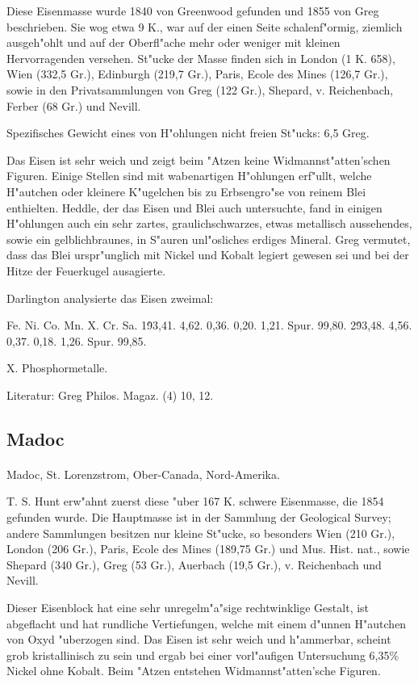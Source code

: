 \documentclass[a4paper, 11pt, oneside]{article}
\begin{document}
Diese Eisenmasse wurde 1840 von Greenwood gefunden und 1855 von Greg beschrieben. Sie wog etwa 9 K., war auf der einen Seite schalenf"ormig, ziemlich ausgeh"ohlt und auf der Oberfl"ache mehr oder weniger mit kleinen Hervorragenden versehen. St"ucke der Masse finden sich in London (1 K. 658), Wien (332,5 Gr.), Edinburgh (219,7 Gr.), Paris, Ecole des Mines (126,7 Gr.), sowie in den Privatsammlungen von Greg (122 Gr.), Shepard, v. Reichenbach, Ferber (68 Gr.) und Nevill.

Spezifisches Gewicht eines von H"ohlungen nicht freien St"ucks: 6,5 Greg.

Das Eisen ist sehr weich und zeigt beim "Atzen keine Widmannst"atten'schen Figuren. Einige Stellen sind mit wabenartigen H"ohlungen erf"ullt, welche H"autchen oder kleinere K"ugelchen bis zu Erbsengro"se von reinem Blei enthielten. Heddle, der das Eisen und Blei auch untersuchte, fand in einigen H"ohlungen auch ein sehr zartes, graulichschwarzes, etwas metallisch aussehendes, sowie ein gelblichbraunes, in S"auren unl"osliches erdiges Mineral. Greg vermutet, dass das Blei urspr"unglich mit Nickel und Kobalt legiert gewesen sei und bei der Hitze der Feuerkugel ausagierte.

Darlington analysierte das Eisen zweimal:

Fe. Ni. Co. Mn. X. Cr. Sa.  
1\. 93,41. 4,62. 0,36. 0,20. 1,21. Spur. 99,80.  
2\. 93,48. 4,56. 0,37. 0,18. 1,26. Spur. 99,85.

X. Phosphormetalle.

Literatur: Greg Philos. Magaz. (4) 10, 12.

\subsection{Madoc}
\normalsize
\paragraph{}
Madoc, St. Lorenzstrom, Ober-Canada, Nord-Amerika.

T. S. Hunt erw"ahnt zuerst diese "uber 167 K. schwere Eisenmasse, die 1854 gefunden wurde. Die Hauptmasse ist in der Sammlung der Geological Survey; andere Sammlungen besitzen nur kleine St"ucke, so besonders Wien (210 Gr.), London (206 Gr.), Paris, Ecole des Mines (189,75 Gr.) und Mus. Hist. nat., sowie Shepard (340 Gr.), Greg (53 Gr.), Auerbach (19,5 Gr.), v. Reichenbach und Nevill.

Dieser Eisenblock hat eine sehr unregelm"a"sige rechtwinklige Gestalt, ist abgeflacht und hat rundliche Vertiefungen, welche mit einem d"unnen H"autchen von Oxyd "uberzogen sind. Das Eisen ist sehr weich und h"ammerbar, scheint grob kristallinisch zu sein und ergab bei einer vorl"aufigen Untersuchung 6,35\% Nickel ohne Kobalt. Beim "Atzen entstehen Widmannst"atten'sche Figuren.
\end{document}
